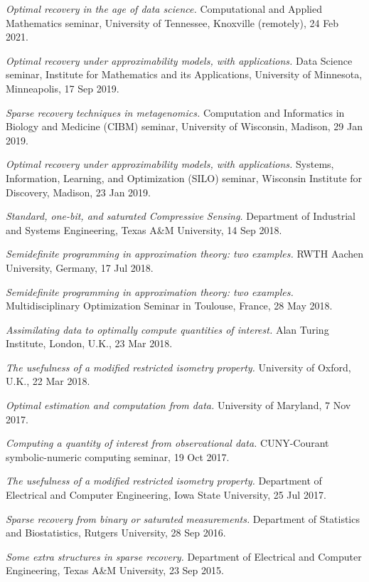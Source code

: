 \documentclass[11pt]{article}
\begin{document}
\item {\sl Optimal recovery in the age of data science.}
Computational and Applied Mathematics seminar,
University of Tennessee, Knoxville (remotely), 24 Feb 2021.
\item {\sl Optimal recovery under approximability models, with applications.}
 Data Science seminar,
 Institute for Mathematics and its Applications,
 University of Minnesota, Minneapolis, 17 Sep 2019.
\item {\sl Sparse recovery techniques in metagenomics.}
Computation and Informatics in Biology and Medicine (CIBM) seminar,
University of Wisconsin, Madison, 29 Jan 2019.
\item {\sl Optimal recovery under approximability models, with applications.}
Systems, Information, Learning, and Optimization (SILO) seminar,
Wisconsin Institute for Discovery, Madison, 23 Jan 2019.
\item {\sl Standard, one-bit, and saturated Compressive Sensing.}
Department of Industrial and Systems Engineering, Texas A\&M University, 14 Sep 2018.
\item {\sl Semidefinite programming in approximation theory: two examples.}
RWTH Aachen University, Germany, 17 Jul 2018.
\item {\sl Semidefinite programming in approximation theory: two examples.} Multidisciplinary Optimization Seminar in Toulouse, France, 28 May 2018.
\item {\sl Assimilating data to optimally compute quantities of interest.} Alan Turing Institute, London, U.K., 23 Mar 2018.
\item {\sl The usefulness of a modified restricted isometry property.} University of Oxford, U.K., 22 Mar 2018.
\item {\sl Optimal estimation and computation from data.} University of Maryland, 7 Nov 2017.
\item {\sl Computing a quantity of interest from observational data.} CUNY-Courant symbolic-numeric computing seminar, 19 Oct 2017.
\item {\sl The usefulness of a modified restricted isometry property.} Department of Electrical and Computer Engineering, Iowa State University, 25 Jul 2017.
\item {\sl Sparse recovery from binary or saturated measurements.} Department of Statistics and Biostatistics, Rutgers University, 28 Sep 2016.
\item {\sl Some extra structures in sparse recovery.} Department of Electrical and Computer Engineering, Texas A\&M University, 23 Sep 2015.
\end{document}
